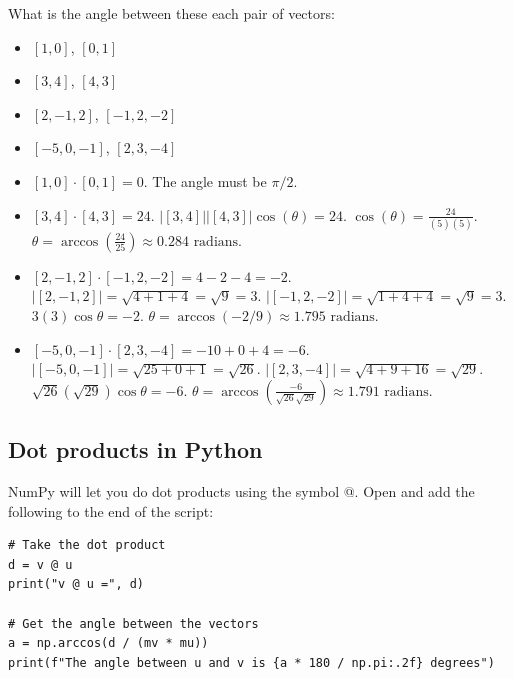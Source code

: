 \begin{Exercise}[title={Using dot products}, label=cos_dot_products]
    What is the angle between these each pair of vectors:
    \begin{itemize}
        \item $[1, 0]$, $[0, 1]$
        \item $[3,4]$, $[4,3]$
        \item $[ 2, -1, 2 ]$, $[-1, 2, -2 ]$
        \item $[-5, 0, -1]$, $[2, 3, -4]$
    \end{itemize}
\end{Exercise}
\begin{Answer}[ref=cos_dot_products]
        \begin{itemize}
            \item $[1,0] \cdot [0,1] = 0$.  The angle must be $\pi/2$.
            \item $[3,4] \cdot [4, 3] = 24$. $|[3,4]| |[4,3]| \cos(\theta) = 24$. 
            $\cos(\theta) = \frac{24}{(5)(5)}$. $\theta = \arccos(\frac{24}{25}) 
            \approx 0.284 \text{ radians}$.
            \item $[2, -1, 2] \cdot [-1, 2, -2] = 4 - 2 - 4 = -2$. $|[2, -1, 2]| = \sqrt{4 + 1 + 4} = \sqrt{9} = 3$. $|[-1, 2, -2]| = \sqrt{1 + 4 + 4} = \sqrt{9} = 3$. $3(3) \cos{\theta} = -2$. $\theta = \arccos{ (-2 / 9)} \approx 1.795 \text{ radians}$.
            \item $[ -5, 0, -1] \cdot [2, 3, -4] = -10 + 0 + 4 = -6$. $|[-5, 0, -1]| = \sqrt{25 + 0 + 1} = \sqrt{26}$. $|[2, 3, -4]| = \sqrt{4 + 9 + 16} = \sqrt{29}$. $\sqrt{26} (\sqrt{29}) \cos{\theta} = -6$. $\theta = \arccos{(\frac{-6}{\sqrt{26}\sqrt{29}})} \approx 1.791 \text{ radians}$.
        \end{itemize}
\end{Answer}

\subsection{Dot products in Python}

NumPy will let you do dot products using the symbol @.  Open  
and add the following to the end of the script:

\begin{verbatim}
# Take the dot product
d = v @ u
print("v @ u =", d)

# Get the angle between the vectors
a = np.arccos(d / (mv * mu))
print(f"The angle between u and v is {a * 180 / np.pi:.2f} degrees")
\end{verbatim}

